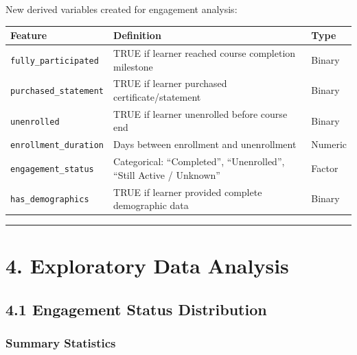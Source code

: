 \documentclass[
]{article}
\begin{document}
New derived variables created for engagement analysis:

\begin{longtable}[]{@{}
  >{\raggedright\arraybackslash}p{}
  >{\raggedright\arraybackslash}p{}
  >{\raggedright\arraybackslash}p{}@{}}
\toprule\noalign{}
\begin{minipage}[b]{\linewidth}\raggedright
Feature
\end{minipage} & \begin{minipage}[b]{\linewidth}\raggedright
Definition
\end{minipage} & \begin{minipage}[b]{\linewidth}\raggedright
Type
\end{minipage} \\
\midrule\noalign{}
\endhead
\bottomrule\noalign{}
\endlastfoot
\texttt{fully\_participated} & TRUE if learner reached course completion
milestone & Binary \\
\texttt{purchased\_statement} & TRUE if learner purchased
certificate/statement & Binary \\
\texttt{unenrolled} & TRUE if learner unenrolled before course end &
Binary \\
\texttt{enrollment\_duration} & Days between enrollment and unenrollment
& Numeric \\
\texttt{engagement\_status} & Categorical: ``Completed'',
``Unenrolled'', ``Still Active / Unknown'' & Factor \\
\texttt{has\_demographics} & TRUE if learner provided complete
demographic data & Binary \\
\end{longtable}

\begin{center}\rule{0.5\linewidth}{0.5pt}\end{center}

\section{4. Exploratory Data Analysis}\label{exploratory-data-analysis}

\subsection{4.1 Engagement Status
Distribution}\label{engagement-status-distribution}

\subsubsection{Summary Statistics}\label{summary-statistics}
\end{document}
